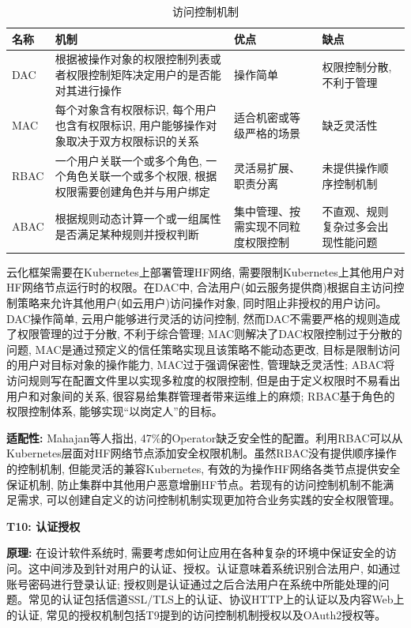 {\footnotesize
\begin{longtable}[h]{m{20pt} m{200pt} m{60pt} m{60pt}}
    \caption[访问控制机制]{访问控制机制} \label{access_control} \\
        \toprule  
        \textbf{名称}&\textbf{机制}&\textbf{优点}&\textbf{缺点}\\
        \hline
        DAC & 根据被操作对象的权限控制列表或者权限控制矩阵决定用户的是否能对其进行操作 & 操作简单 & 权限控制分散, 不利于管理 \\

        MAC & 每个对象含有权限标识, 每个用户也含有权限标识, 用户能够操作对象取决于双方权限标识的关系 & 适合机密或等级严格的场景 & 缺乏灵活性 \\

        RBAC & 一个用户关联一个或多个角色, 一个角色关联一个或多个权限, 根据权限需要创建角色并与用户绑定 & 灵活易扩展、职责分离 & 未提供操作顺序控制机制 \\

        ABAC & 根据规则动态计算一个或一组属性是否满足某种规则并授权判断 & 集中管理、按需实现不同粒度权限控制 & 不直观、规则复杂过多会出现性能问题 \\
        \bottomrule
    \end{longtable}
}

云化框架需要在Kubernetes上部署管理HF网络, 需要限制Kubernetes上其他用户对HF网络节点运行时的权限。在DAC中, 合法用户(如云服务提供商)根据自主访问控制策略来允许其他用户(如云用户)访问操作对象\cite{lopez2018access}, 同时阻止非授权的用户访问。DAC操作简单, 云用户能够进行灵活的访问控制, 然而DAC不需要严格的规则造成了权限管理的过于分散, 不利于综合管理; MAC则解决了DAC权限控制过于分散的问题, MAC是通过预定义的信任策略实现且该策略不能动态更改, 目标是限制访问的用户对目标对象的操作能力, MAC过于强调保密性, 管理缺乏灵活性; ABAC将访问规则写在配置文件里以实现多粒度的权限控制, 但是由于定义权限时不易看出用户和对象间的关系, 很容易给集群管理者带来运维上的麻烦; RBAC基于角色的权限控制体系, 能够实现“以岗定人”的目标。


\textbf{适配性: }Mahajan等人\cite{mahajan2020suture}指出, 47\%的Operator缺乏安全性的配置。利用RBAC可以从Kubernetes层面对HF网络节点添加安全权限机制。虽然RBAC没有提供顺序操作的控制机制, 但能灵活的兼容Kubernetes, 有效的为操作HF网络各类节点提供安全保证机制, 防止集群中其他用户恶意增删HF节点。若现有的访问控制机制不能满足需求, 可以创建自定义的访问控制机制实现更加符合业务实践的安全权限管理。

\textbf{T10: 认证授权}

\textbf{原理: }在设计软件系统时, 需要考虑如何让应用在各种复杂的环境中保证安全的访问。这中间涉及到针对用户的认证、授权。认证意味着系统识别合法用户, 如通过账号密码进行登录认证; 授权则是认证通过之后合法用户在系统中所能处理的问题。常见的认证包括信道SSL/TLS上的认证、协议HTTP上的认证以及内容Web上的认证, 常见的授权机制包括T9提到的访问控制机制授权以及OAuth2授权等。

